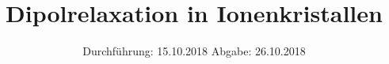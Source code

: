 

\subject{48}
\title{Dipolrelaxation in Ionenkristallen}
\date{
  Durchführung: 15.10.2018
  \hspace{3em}
  Abgabe: 26.10.2018
}



\maketitle
\thispagestyle{empty}
\tableofcontents
\newpage
\setcounter{page}{1}




\appendix

\printbibliography


